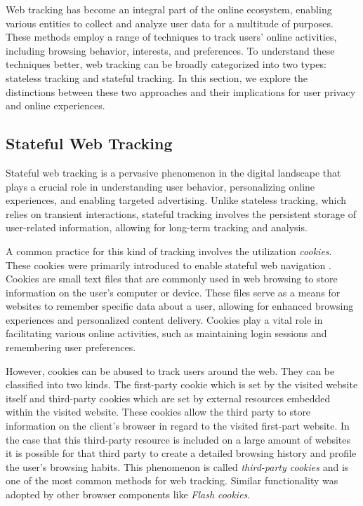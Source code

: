 Web tracking has become an integral part of the online ecosystem, enabling various 
entities to collect and analyze user data for a multitude of purposes. These methods
employ a range of techniques to track users' online activities, including browsing behavior,
interests, and preferences. To understand these techniques better, web tracking can be broadly
categorized into two types: stateless tracking and stateful tracking. In this section, we explore
the distinctions between these two approaches and their implications for user privacy and online experiences.

\subsection{Stateful Web Tracking}
Stateful web tracking is a pervasive phenomenon in the digital landscape that plays a crucial role in understanding user behavior,
personalizing online experiences, and enabling targeted advertising. Unlike stateless tracking, which relies on transient interactions,
stateful tracking involves the persistent storage of user-related information, allowing for long-term tracking and analysis. 

A common practice for this kind of tracking involves the utilization \emph{cookies}. These cookies were primarily introduced to enable 
stateful web navigation \cite{jschwartz}. Cookies are small text files that are commonly used in web browsing to store information
on the user's computer or device. These files serve as a means for websites to remember specific data about a user,
allowing for enhanced browsing experiences and personalized content delivery. Cookies play a vital role in facilitating
various online activities, such as maintaining login sessions and remembering user preferences.

However, cookies can be abused to track users around the web. They can be classified into two kinds.
The first-party cookie which is set by the visited website itself and third-party cookies which are set by external 
resources embedded within the visited website. These cookies allow the third party to store information on the client's browser in regard 
to the visited first-part website. In the case that this third-party resource is included on a large amount of websites it is possible 
for that third party to create a detailed browsing history and profile the user's browsing habits. This phenomenon is called \emph{third-party cookies}
and is one of the most common methods for web tracking. Similar functionality was adopted by other browser components like
\emph{Flash cookies}. 

